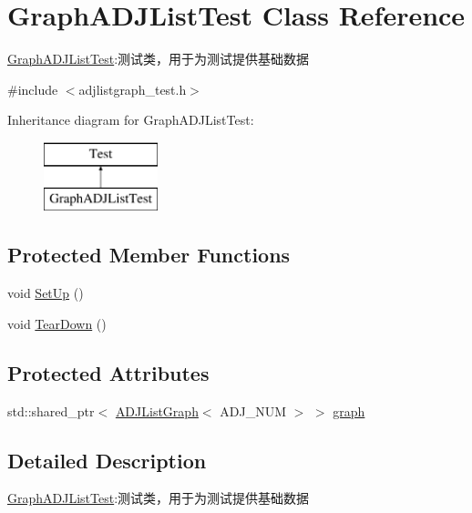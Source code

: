 \hypertarget{class_graph_a_d_j_list_test}{}\section{Graph\+A\+D\+J\+List\+Test Class Reference}
\label{class_graph_a_d_j_list_test}


\hyperlink{class_graph_a_d_j_list_test}{Graph\+A\+D\+J\+List\+Test}\+:测试类，用于为测试提供基础数据  




{\ttfamily \#include $<$adjlistgraph\+\_\+test.\+h$>$}

Inheritance diagram for Graph\+A\+D\+J\+List\+Test\+:\begin{figure}[H]
\begin{center}
\leavevmode
\includegraphics[height=2.000000cm]{class_graph_a_d_j_list_test}
\end{center}
\end{figure}
\subsection*{Protected Member Functions}
\begin{DoxyCompactItemize}
\item 
void \hyperlink{class_graph_a_d_j_list_test_a72021ff735af11b1db48290ea0fa8a6b}{Set\+Up} ()
\item 
void \hyperlink{class_graph_a_d_j_list_test_a79dc8e149913c35045b362c44a5fed46}{Tear\+Down} ()
\end{DoxyCompactItemize}
\subsection*{Protected Attributes}
\begin{DoxyCompactItemize}
\item 
std\+::shared\+\_\+ptr$<$ \hyperlink{struct_introduction_to_algorithm_1_1_graph_algorithm_1_1_a_d_j_list_graph}{A\+D\+J\+List\+Graph}$<$ A\+D\+J\+\_\+\+N\+U\+M $>$ $>$ \hyperlink{class_graph_a_d_j_list_test_afcd2f035a4957685bc697f296bb2b4b5}{graph}
\end{DoxyCompactItemize}


\subsection{Detailed Description}
\hyperlink{class_graph_a_d_j_list_test}{Graph\+A\+D\+J\+List\+Test}\+:测试类，用于为测试提供基础数据 

